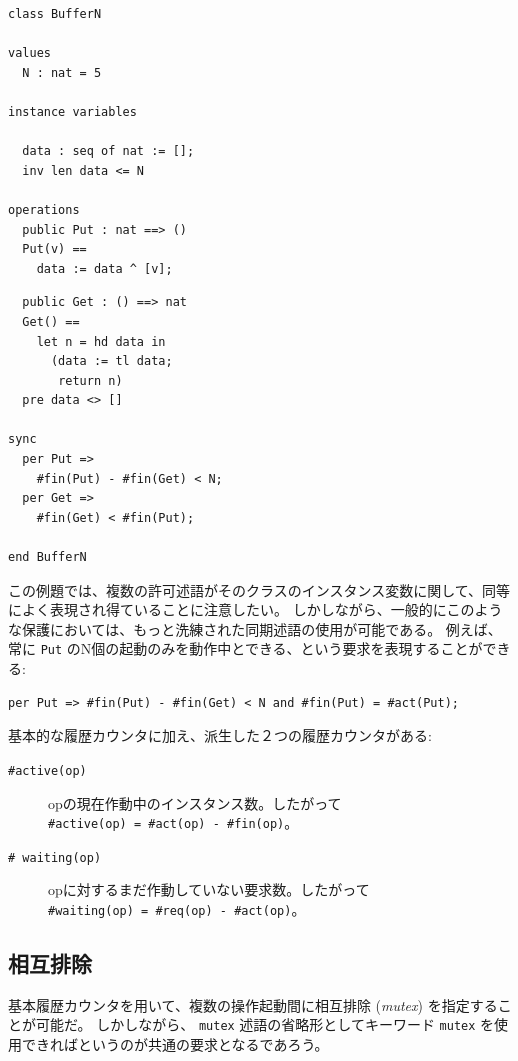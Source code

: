 \documentclass[\pformat,12pt]{jreport}
\begin{document}
\begin{multicols}{2}
\begin{lstlisting}
class BufferN

values
  N : nat = 5

instance variables

  data : seq of nat := [];
  inv len data <= N

operations
  public Put : nat ==> ()
  Put(v) ==
    data := data ^ [v];

\end{lstlisting}
\begin{lstlisting}
  public Get : () ==> nat
  Get() ==
    let n = hd data in
      (data := tl data;
       return n)
  pre data <> []

sync
  per Put =>
    #fin(Put) - #fin(Get) < N;
  per Get =>
    #fin(Get) < #fin(Put);

end BufferN
\end{lstlisting}
\end{multicols}

この例題では、複数の許可述語がそのクラスのインスタンス変数に関して、同等によく表現され得ていることに注意したい。
しかしながら、一般的にこのような保護においては、もっと洗練された同期述語の使用が可能である。
例えば、 常に \texttt{Put} のN個の起動のみを動作中とできる、という要求を表現することができる:

\begin{lstlisting}
per Put => #fin(Put) - #fin(Get) < N and #fin(Put) = #act(Put);
\end{lstlisting}

基本的な履歴カウンタに加え、派生した２つの履歴カウンタがある:

\begin{description}
\item[\texttt{\#active(op)}]  opの現在作動中のインスタンス数。したがって \\ \texttt{\#active(op) = \#act(op) - \#fin(op)}。
\item[\texttt{\# waiting(op)}]  opに対するまだ作動していない要求数。したがって \\ \texttt{\#waiting(op) = \#req(op) - \#act(op)}。
\end{description}

\subsection{相互排除}

基本履歴カウンタを用いて、複数の操作起動間に相互排除 (\emph{mutex}) を指定することが可能だ。
しかしながら、 \texttt{mutex} 述語の省略形としてキーワード \texttt{mutex} を使用できればというのが共通の要求となるであろう。
\end{document}

